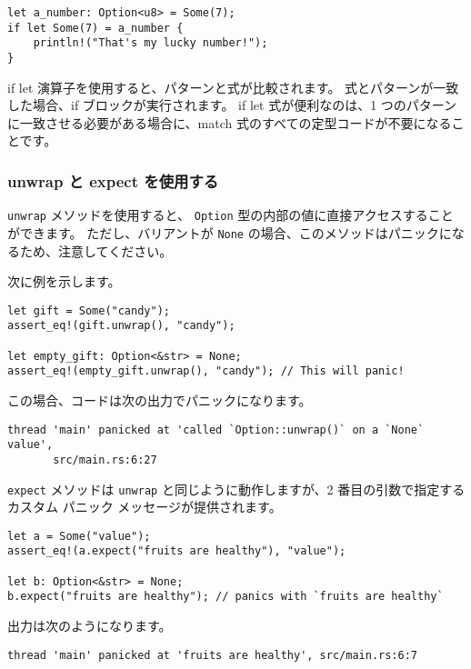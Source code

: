 \begin{lstlisting}[numbers=none]
let a_number: Option<u8> = Some(7);
if let Some(7) = a_number {
    println!("That's my lucky number!");
}
\end{lstlisting}

if let 演算子を使用すると、パターンと式が比較されます。 式とパターンが一致した場合、if ブロックが実行されます。 if let 式が便利なのは、1 つのパターンに一致させる必要がある場合に、match 式のすべての定型コードが不要になることです。

\subsubsection{unwrap と expect を使用する}

\texttt{unwrap} メソッドを使用すると、 \texttt{Option} 型の内部の値に直接アクセスすることができます。 ただし、バリアントが \texttt{None} の場合、このメソッドはパニックになるため、注意してください。

次に例を示します。

\begin{lstlisting}[numbers=none]
let gift = Some("candy");
assert_eq!(gift.unwrap(), "candy");

let empty_gift: Option<&str> = None;
assert_eq!(empty_gift.unwrap(), "candy"); // This will panic!
\end{lstlisting}

この場合、コードは次の出力でパニックになります。

\begin{lstlisting}[numbers=none]
    thread 'main' panicked at 'called `Option::unwrap()` on a `None` value',
       src/main.rs:6:27
\end{lstlisting}

\texttt{expect} メソッドは \texttt{unwrap} と同じように動作しますが、2 番目の引数で指定するカスタム パニック メッセージが提供されます。

\begin{lstlisting}[numbers=none]
let a = Some("value");
assert_eq!(a.expect("fruits are healthy"), "value");

let b: Option<&str> = None;
b.expect("fruits are healthy"); // panics with `fruits are healthy`
\end{lstlisting}

出力は次のようになります。

\begin{lstlisting}[numbers=none]
    thread 'main' panicked at 'fruits are healthy', src/main.rs:6:7
\end{lstlisting}

